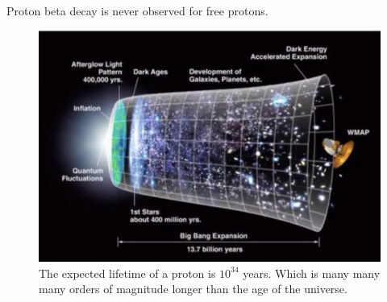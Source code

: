 \documentclass[class=article,crop=false]{standalone}
\begin{document}
Proton beta decay is never observed for free protons. 

\begin{figure}[h!]
	\centering
	\includegraphics[width=.6\linewidth]{./Images/universe.png}
	\caption{The expected lifetime of a proton is $10^{34}$ years. Which is many many many orders of magnitude longer than the age of the universe.}
\end{figure}
\end{document}
